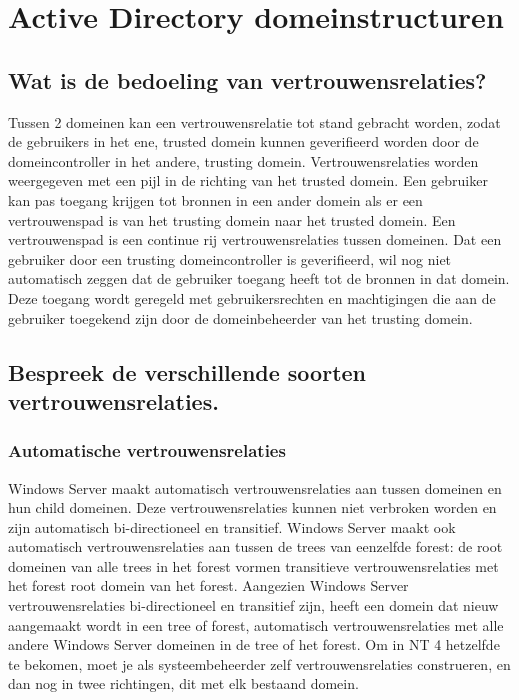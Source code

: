 \chapter{Active Directory domeinstructuren}

\section{Wat is de bedoeling van vertrouwensrelaties?}

Tussen 2 domeinen kan een vertrouwensrelatie tot stand gebracht worden, zodat de
gebruikers in het ene, trusted domein kunnen geverifieerd worden door de
domeincontroller in het andere, trusting domein. Vertrouwensrelaties worden
weergegeven met een pijl in de richting van het trusted domein. Een gebruiker
kan pas toegang krijgen tot bronnen in een ander domein als er een
vertrouwenspad is van het trusting domein naar het trusted domein. Een
vertrouwenspad is een continue rij vertrouwensrelaties tussen domeinen. Dat een
gebruiker door een trusting domeincontroller is geverifieerd, wil nog niet
automatisch zeggen dat de gebruiker toegang heeft tot de bronnen in dat domein.
Deze toegang wordt geregeld met gebruikersrechten en machtigingen die aan de
gebruiker toegekend zijn door de domeinbeheerder van het trusting domein.

\section{Bespreek de verschillende soorten vertrouwensrelaties.}

\subsection{Automatische vertrouwensrelaties}

Windows Server maakt automatisch vertrouwensrelaties aan tussen domeinen en hun
child domeinen. Deze vertrouwensrelaties kunnen niet verbroken worden en zijn
automatisch bi-directioneel en transitief. Windows Server maakt ook automatisch
vertrouwensrelaties aan tussen de trees van eenzelfde forest: de root domeinen
van alle trees in het forest vormen transitieve vertrouwensrelaties met het
forest root domein van het forest.
Aangezien Windows Server vertrouwensrelaties bi-directioneel en transitief zijn,
heeft een domein dat nieuw aangemaakt wordt in een tree of forest, automatisch
vertrouwensrelaties met alle andere Windows Server domeinen in de tree of het
forest.
Om in NT 4 hetzelfde te bekomen, moet je als systeembeheerder zelf
vertrouwensrelaties construeren, en dan nog in twee richtingen, dit met elk
bestaand domein.

